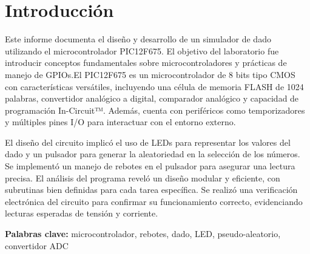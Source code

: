 \section{Introducción}

\hspace{1.26cm} Este informe documenta el diseño y desarrollo de un simulador de dado utilizando el microcontrolador PIC12F675. El objetivo del laboratorio fue introducir conceptos fundamentales sobre microcontroladores y prácticas de manejo de GPIOs.El PIC12F675 es un microcontrolador de 8 bits tipo CMOS con características versátiles, incluyendo una célula de memoria FLASH de 1024 palabras, convertidor analógico a digital, comparador analógico y capacidad de programación In-Circuit™. Además, cuenta con periféricos como temporizadores y múltiples pines I/O para interactuar con el entorno externo.

\hspace{1.26cm} El diseño del circuito implicó el uso de LEDs para representar los valores del dado y un pulsador para generar la aleatoriedad en la selección de los números. Se implementó un manejo de rebotes en el pulsador para asegurar una lectura precisa. El análisis del programa reveló un diseño modular y eficiente, con subrutinas bien definidas para cada tarea específica. Se realizó una verificación electrónica del circuito para confirmar su funcionamiento correcto, evidenciando lecturas esperadas de tensión y corriente.

\textbf{Palabras clave:} microcontrolador, rebotes, dado, LED, pseudo-aleatorio, convertidor ADC
